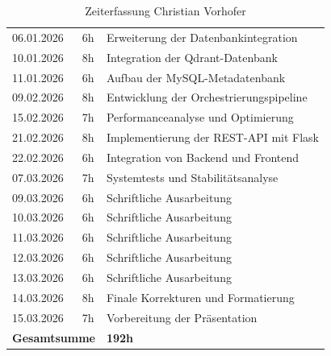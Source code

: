 \begin{table}[H]
\begin{tabular}{|l|c|p{8.5cm}|}
		06.01.2026                                 & 6h            & Erweiterung der Datenbankintegration    \\
		10.01.2026                                 & 8h            & Integration der Qdrant-Datenbank        \\
		11.01.2026                                 & 6h            & Aufbau der MySQL-Metadatenbank          \\
		09.02.2026                                 & 8h            & Entwicklung der Orchestrierungspipeline \\
		15.02.2026                                 & 7h            & Performanceanalyse und Optimierung      \\
		21.02.2026                                 & 8h            & Implementierung der REST-API mit Flask  \\
		22.02.2026                                 & 6h            & Integration von Backend und Frontend    \\
		07.03.2026                                 & 7h            & Systemtests und Stabilitätsanalyse      \\
		09.03.2026                                 & 6h            & Schriftliche Ausarbeitung               \\
		10.03.2026                                 & 6h            & Schriftliche Ausarbeitung               \\
		11.03.2026                                 & 6h            & Schriftliche Ausarbeitung               \\
		12.03.2026                                 & 6h            & Schriftliche Ausarbeitung               \\
		13.03.2026                                 & 6h            & Schriftliche Ausarbeitung               \\
		14.03.2026                                 & 8h            & Finale Korrekturen und Formatierung     \\
		15.03.2026                                 & 7h            & Vorbereitung der Präsentation           \\
		\hline
		\multicolumn{2}{|r|}{\textbf{Gesamtsumme}} & \textbf{192h}                                           \\
		\hline
	\end{tabular}
	\caption{Zeiterfassung Christian Vorhofer}
\end{table}
